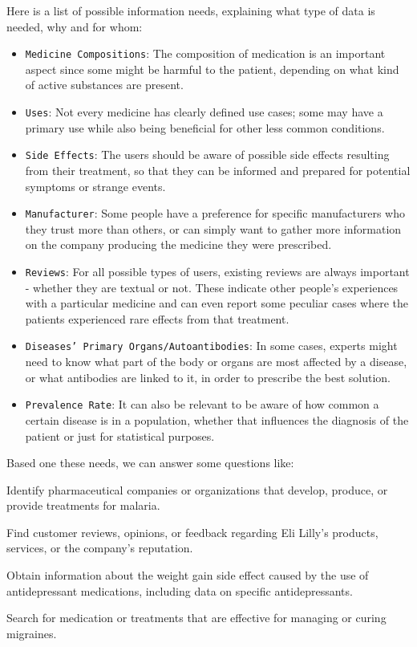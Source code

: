 \documentclass[sigconf]{acmart}
\begin{document}
Here is a list of possible information needs, explaining what type of data is needed, why and for whom:
\begin{itemize}
	\item {\texttt{Medicine Compositions}}: The composition of medication is an important aspect since some might be harmful to the patient, depending on what kind of active substances are present.
	\item {\texttt{Uses}}: Not every medicine has clearly defined use cases; some may have a primary use while also being beneficial for other less common conditions.
	\item {\texttt{Side Effects}}: The users should be aware of possible side effects resulting from their treatment, so that they can be informed and prepared for potential symptoms or strange events.
	\item {\texttt{Manufacturer}}: Some people have a preference for specific manufacturers who they trust more than others, or can simply want to gather more information on the company producing the medicine they were prescribed.
	\item {\texttt{Reviews}}: For all possible types of users, existing reviews are always important - whether they are textual or not. These indicate other people's experiences with a particular medicine and can even report some peculiar cases where the patients experienced rare effects from that treatment.
	\item {\texttt{Diseases' Primary Organs/Autoantibodies}}: In some cases, experts might need to know what part of the body or organs are most affected by a disease, or what antibodies are linked to it, in order to prescribe the best solution.
	\item {\texttt{Prevalence Rate}}: It can also be relevant to be aware of how common a certain disease is in a population, whether that influences the diagnosis of the patient or just for statistical purposes.
\end{itemize}

Based one these needs, we can answer some questions like:
\begin{arrowlist}
        \item Identify pharmaceutical companies or organizations that
    develop, produce, or provide treatments for malaria.
	\item Find customer reviews, opinions, or feedback regarding Eli Lilly's products, services, or the company's reputation.
	\item Obtain information about the weight gain side effect caused by the use of antidepressant medications, including data on specific antidepressants.
	\item Search for medication or treatments that are effective for managing or curing migraines.
\end{arrowlist}
\end{document}
